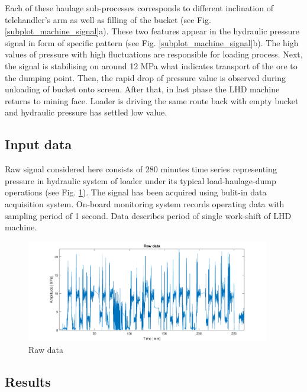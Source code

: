 \documentclass{webofc}
\begin{document}
Each of these haulage sub-processes corresponds to different inclination of telehandler’s arm as well as filling of the bucket (see Fig. \ref{subplot_machine_signal}a). These two features appear in the hydraulic pressure signal in form of specific pattern (see Fig. \ref{subplot_machine_signal}b). The high values of pressure with high fluctuations are responsible for loading process. Next, the signal is stabilising on around 12 MPa what indicates transport of the ore to the dumping point. Then, the rapid drop of pressure value is observed during unloading of bucket onto screen. After that, in last phase the LHD machine returns to mining face. Loader is driving the same route back with empty bucket and hydraulic pressure has settled low value.

\subsection{Input data}

Raw signal considered here consists of 280 minutes time series representing pressure in hydraulic system of loader under its typical load-haulage-dump operations (see Fig. \ref{surowe}). The signal has been acquired using bulit-in data acquisition system. On-board monitoring system records operating data with sampling period of 1 second. Data describes period of single work-shift of LHD machine.

\begin{figure}[ht!]
\centering
\includegraphics[width=0.95\textwidth,clip]{raw_data}
\caption{Raw data}
\label{surowe}       %
\vspace*{-0.8cm}
\end{figure}

\subsection{Results}
\end{document}
